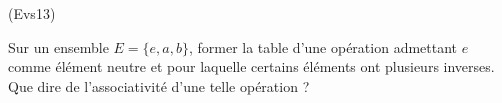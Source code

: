 \begin{tiny}(Evs13)\end{tiny} Sur un ensemble $E=\{e,a,b\}$, former la table d'une opération admettant $e$ comme élément neutre et pour laquelle certains éléments ont plusieurs inverses. Que dire de l'associativité d'une telle opération ?